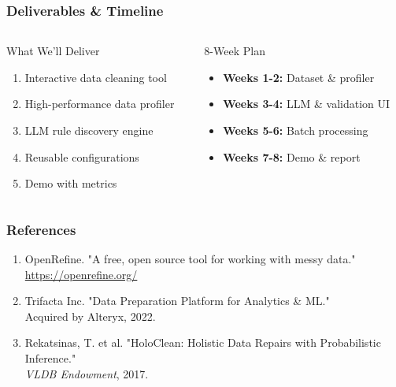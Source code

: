 \documentclass{beamer}
\begin{document}
\begin{frame}
    \frametitle{Deliverables \& Timeline}
    
    \begin{columns}[T]
        \begin{column}{0.48\textwidth}
            \begin{block}{What We'll Deliver}
                \begin{enumerate}
                    \item Interactive data cleaning tool
                    \item High-performance data profiler
                    \item LLM rule discovery engine
                    \item Reusable configurations
                    \item Demo with metrics
                \end{enumerate}
            \end{block}
        \end{column}
        
        \begin{column}{0.48\textwidth}
            \begin{exampleblock}{8-Week Plan}
                \small
                \begin{itemize}
                    \item \textbf{Weeks 1-2:} Dataset \& profiler
                    \item \textbf{Weeks 3-4:} LLM \& validation UI
                    \item \textbf{Weeks 5-6:} Batch processing
                    \item \textbf{Weeks 7-8:} Demo \& report
                \end{itemize}
                \vspace{0.3cm}
            \end{exampleblock}
        \end{column}
    \end{columns}
\end{frame}

\begin{frame}[allowframebreaks]
    \frametitle{References}
    
    \footnotesize
    \begin{enumerate}
        \item OpenRefine. "A free, open source tool for working with messy data." \\
              \url{https://openrefine.org/}
        
        \item Trifacta Inc. "Data Preparation Platform for Analytics \& ML." \\
              Acquired by Alteryx, 2022.
        
        \item Rekatsinas, T. et al. "HoloClean: Holistic Data Repairs with Probabilistic Inference." \\
              \textit{VLDB Endowment}, 2017.
    \end{enumerate}
\end{frame}
\end{document}
